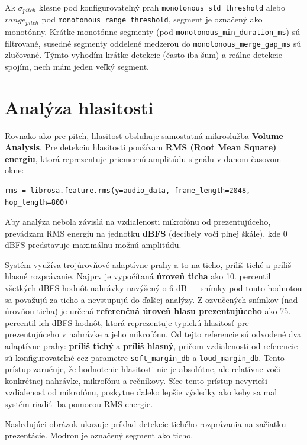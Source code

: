 Ak $\sigma_{pitch}$ klesne pod konfigurovateľný prah \texttt{monotonous\_std\_threshold} alebo $range_{pitch}$ pod \texttt{monotonous\_range\_threshold}, segment je označený ako monotónny.
Krátke monotónne segmenty (pod \texttt{monotonous\_min\_duration\_ms}) sú filtrované, susedné segmenty oddelené medzerou do \texttt{monotonous\_merge\_gap\_ms} sú zlučované.
Týmto vyhodím krátke detekcie (často iba šum) a reálne detekcie spojím, nech mám jeden veľký segment.

\section{Analýza hlasitosti}

Rovnako ako pre pitch, hlasitosť obsluhuje samostatná mikroslužba \textbf{Volume Analysis}.
Pre detekciu hlasitosti používam \textbf{RMS (Root Mean Square) energiu}, ktorá reprezentuje priemernú amplitúdu signálu v danom časovom okne:

\begin{verbatim}
rms = librosa.feature.rms(y=audio_data, frame_length=2048, hop_length=800)
\end{verbatim}

Aby analýza nebola závislá na vzdialenosti mikrofónu od prezentujúceho, prevádzam RMS energiu na jednotku \textbf{dBFS} (decibely voči plnej škále), kde 0 dBFS predstavuje maximálnu možnú amplitúdu.

Systém využíva trojúrovňové adaptívne prahy a to na ticho, príliš tiché a príliš hlasné rozprávanie.
Najprv je vypočítaná \textbf{úroveň ticha} ako 10. percentil všetkých dBFS hodnôt nahrávky navýšený o 6 dB --- snímky pod touto hodnotou sa považujú za ticho a nevstupujú do ďalšej analýzy.
Z ozvučených snímkov (nad úrovňou ticha) je určená \textbf{referenčná úroveň hlasu prezentujúceho} ako 75. percentil ich dBFS hodnôt, ktorá reprezentuje typickú hlasitosť pre prezentujúceho v nahrávke a jeho mikrofónu.
Od tejto referencie sú odvodené dva adaptívne prahy: \textbf{príliš tichý} a \textbf{príliš hlasný}, pričom vzdialenosti od referencie sú konfigurovateľné cez parametre \texttt{soft\_margin\_db} a \texttt{loud\_margin\_db}.
Tento prístup zaručuje, že hodnotenie hlasitosti nie je absolútne, ale relatívne voči konkrétnej nahrávke, mikrofónu a rečníkovy. Síce tento prístup nevyrieši vzdialenosť od mikrofónu, poskytne ďaleko lepšie výsledky ako keby sa mal systém riadiť iba pomocou RMS energie.

Nasledujúci obrázok ukazuje príklad detekcie tichého rozprávania na začiatku prezentácie. Modrou je označený segment ako ticho.

